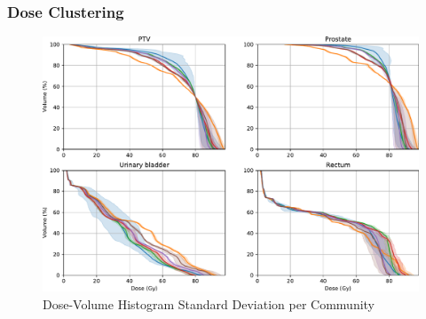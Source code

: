 \documentclass{beamer}
\begin{document}
	\begin{frame}
		\frametitle{Dose Clustering}
		\begin{figure}
			\includegraphics[width=\linewidth]{figures/dvh_std.pdf}
			\caption{Dose-Volume Histogram Standard Deviation per Community}
		\end{figure}
	\end{frame}
	
\end{document}
